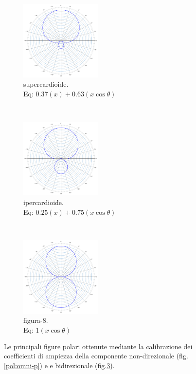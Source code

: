 \begin{figure}[h]
\begin{subfigure}[t]{0.3\textwidth}
    \end{subfigure}
    \\
    \begin{subfigure}[t]{0.3\textwidth}
        \centering
        \includegraphics[height=4cm]{CAPITOLI/_TIKZ/POLAR/supercardioid}
        \caption{supercardioide. \\ Eq: $0.37(x)+0.63(x\cos\theta)$}
        \label{pol:iper-p}
    \end{subfigure}
    ~
    \begin{subfigure}[t]{0.3\textwidth}
        \centering
        \includegraphics[height=4cm]{CAPITOLI/_TIKZ/POLAR/hypercardioid}
        \caption{ipercardioide. \\ Eq: $0.25(x)+0.75(x\cos\theta)$}
        \label{pol:iper-p}
    \end{subfigure}
    ~
    \begin{subfigure}[t]{0.3\textwidth}
        \centering
        \includegraphics[height=4cm]{CAPITOLI/_TIKZ/POLAR/fig8}
        \caption{figura-8. \\ Eq: $1(x\cos\theta)$}
        \label{pol:fig8-p}
    \end{subfigure}
    \caption{Le principali figure polari ottenute mediante la calibrazione dei
    coefficienti di ampiezza della componente non-direzionale (fig. \ref{pol:omni-p}) e
    e bidirezionale (fig.\ref{pol:fig8-p}).}
    \label{pol:princicpali}
\end{figure}
